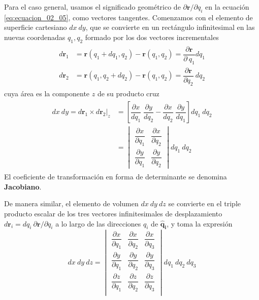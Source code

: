 Para el caso general, usamos el significado geométrico de $\partial \mathbf{r} / \partial q_{i}$ en la ecuación \ref{eq:ecuacion_02_05}, como vectores tangentes. Comenzamos con el elemento de superficie cartesiano $dx \: dy$, que se convierte en un rectángulo infinitesimal en las nuevas coordenadas $q_{1}, q_{2}$  formado por los dos vectores incrementales
\begin{align}
\begin{aligned}
d \mathbf{r}_{1} &= \mathbf{r} (q_{1} + dq_{1}, q_{2}) - \mathbf{r}(q_{1},q_{2}) = \dfrac{\partial \mathbf{r}}{\partial \: q_{1}} dq_{1} \\
d \mathbf{r}_{2} &= \mathbf{r} (q_{1}, q_{2} + dq_{2}) - \mathbf{r}(q_{1},q_{2}) = \dfrac{\partial \mathbf{r}}{\partial q_{2}} \: dq_{2}
\end{aligned}
\label{eq:ecuacion_02_14}
\end{align}
cuya área es la componente $z$ de su producto cruz
\begin{align}
\begin{aligned}
dx\: dy = d \mathbf{r}_{1} \times d \mathbf{r}_{2} \big\vert_{z} &= \left[ \dfrac{\partial x}{dq_{1}} \; \dfrac{\partial y}{dq_{2}} - \dfrac{\partial x}{dq_{2}} \; \dfrac{\partial y}{dq_{1}} \right] dq_{1} \: dq_{2} \\
&= \begin{vmatrix}
\dfrac{\partial x}{\partial q_{1}} & \dfrac{\partial x}{\partial q_{2}} \\[1em]
\dfrac{\partial y}{\partial q_{1}} & \dfrac{\partial y}{\partial q_{2}} 
\end{vmatrix} dq_{1} \: d q_{2}
\end{aligned}
\label{eq:ecuacion_02_15}
\end{align}
El coeficiente de transformación en forma de determinante se denomina \textbf{Jacobiano}.
\par
De manera similar, el elemento de volumen $dx \: dy \: dz$ se convierte en el triple producto escalar de los tres vectores infinitesimales de desplazamiento $d \mathbf{r}_{i}  = d q_{i} \: \partial \mathbf{r} / \partial q_{i} $ a lo largo de las direcciones $q_{i}$ de $\mathbf{\widehat{q}_{i}}$, y toma la expresión
\begin{equation}
dx \: dy \: dz = \begin{vmatrix}
\dfrac{\partial x}{\partial q_{1}} & \dfrac{\partial x}{\partial q_{2}} & \dfrac{\partial x}{\partial q_{3}} \\[1em]
\dfrac{\partial y}{\partial q_{1}} & \dfrac{\partial y}{\partial q_{2}} & \dfrac{\partial y}{\partial q_{3}} \\[1em]
\dfrac{\partial z}{\partial q_{1}} & \dfrac{\partial z}{\partial q_{2}} & \dfrac{\partial z}{\partial q_{3}} \\
\end{vmatrix}
d q_{1} \: d q_{2} \: d q_{3} 
\label{eq:ecuacion_02_16}
\end{equation}
